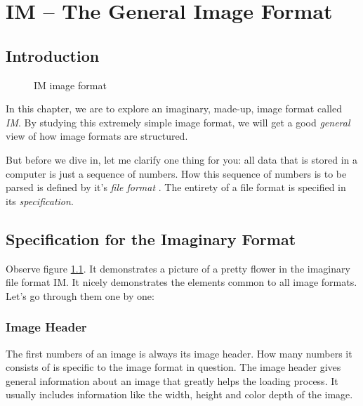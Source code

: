 \begin{comment}
  
\end{comment}

\chapter{IM -- The General Image Format}
\label{cha:im}

\section{Introduction}

\begin{figure}
  \centering
  \caption{IM image format}
  \label{fig:im}
\end{figure}

In this chapter, we are to explore an imaginary, made-up, image format
called \textit{IM}. By studying this extremely simple image
format, we will get a good \textit{general} view of how image formats
are structured.

But before we dive in, let me clarify one thing for you: all data that
is stored in a computer is just a sequence of numbers. How this
sequence of numbers is to be parsed is defined by it's \textit{file
  format} . The entirety of a file format is
specified in its \textit{specification}.

\section{Specification for the Imaginary Format}

Observe figure \ref{fig:im}. It demonstrates a picture of a pretty
flower in the imaginary file format IM. It nicely
demonstrates the elements common to all image formats. Let's go
through them one by one:

\subsection{Image Header}

The first numbers of an image is always its image header. How many numbers it consists of is specific to the image
format in question. The image header gives general information about
an image that greatly helps the loading process. It usually includes
information like the width, height and color depth of the image.

